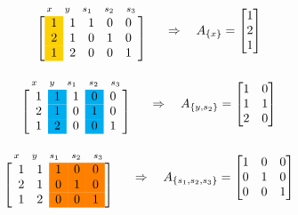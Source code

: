 \[
\begin{array}{c}
\begin{array}{ccccc}
\scriptstyle x & \scriptstyle y & \scriptstyle s_1 & \scriptstyle s_2 & \scriptstyle s_3
\end{array} \\
\left[
\begin{array}{>{\columncolor{yellow}}c c c c c}
1 & 1 & 1 & 0 & 0 \\
2 & 1 & 0 & 1 & 0 \\
1 & 2 & 0 & 0 & 1
\end{array}
\right]
\end{array}
\quad
\Rightarrow
\quad
A_{\{x\}} =
\begin{bmatrix}
1 \\
2 \\
1
\end{bmatrix}
\]

\bigskip

\[
\begin{array}{c}
\begin{array}{ccccc}
\scriptstyle x & \scriptstyle y & \scriptstyle s_1 & \scriptstyle s_2 & \scriptstyle s_3
\end{array} \\
\left[
\begin{array}{c>{\columncolor{cyan}}c c >{\columncolor{cyan}}c c}
1 & 1 & 1 & 0 & 0 \\
2 & 1 & 0 & 1 & 0 \\
1 & 2 & 0 & 0 & 1
\end{array}
\right]
\end{array}
\quad
\Rightarrow
\quad
A_{\{y, s_2\}} =
\begin{bmatrix}
1 & 0 \\
1 & 1 \\
2 & 0
\end{bmatrix}
\]
\bigskip

\[
\begin{array}{c}
\begin{array}{ccccc}
\scriptstyle x & \scriptstyle y & \scriptstyle s_1 & \scriptstyle s_2 & \scriptstyle s_3
\end{array} \\
\left[
\begin{array}{c c >{\columncolor{orange}}c >{\columncolor{orange}}c >{\columncolor{orange}}c}
1 & 1 & 1 & 0 & 0 \\
2 & 1 & 0 & 1 & 0 \\
1 & 2 & 0 & 0 & 1
\end{array}
\right]
\end{array}
\quad
\Rightarrow
\quad
A_{\{s_1, s_2, s_3\}} =
\begin{bmatrix}
1 & 0 & 0 \\
0 & 1 & 0 \\
0 & 0 & 1
\end{bmatrix}
\]

